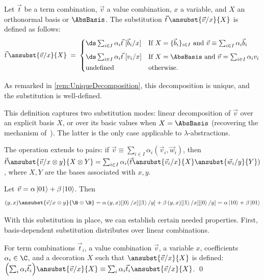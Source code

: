 \begin{definition}\label{def:basisDependentSub}
  Let $\vec t$ be a term combination, $\vec v$ a value combination, $x$ a
  variable, and $X$ an orthonormal basis or $\AbsBasis$. The substitution 
  $\vec t\,\ansubst{\vec v/x}{X}$ is defined as follows:
  \[
  \vec t\,\ansubst{\vec v/x}{X}\;=\;
  \begin{cases}
    \ds\sum_{i\in I}\alpha_i\vec{t}\;[\vec{b}_i/x] &
    \text{If } X=\{\vec{b}_i\}_{i\in I}\text{ and }
    \vec{v}\equiv\sum_{i\in I} \alpha_i\vec{b}_i\\[6pt]
    \ds\sum_{i\in I}\alpha_i\vec{t}\;[v_i/x] &
    \text{If }X=\AbsBasis\text{ and }
    \vec{v}=\sum_{i\in I} \alpha_i v_i\\[2pt]
    \text{undefined} & \text{otherwise.}
  \end{cases}
  \]
  
  As remarked in \ref{rem:UniqueDecomposition}, this decomposition
  is unique, and the substitution is well-defined.
\end{definition}

This definition captures two substitution modes: linear decomposition of $\vec v$
over an explicit basis $X$, or over its basic values when $X=\AbsBasis$
(recovering the mechanism of~\cite{ArrighiDowekLMCS17}). The latter is the only
case applicable to $\lambda$-abstractions.

The operation extends to pairs: if
$\vec v\equiv\sum_{i\in I}\alpha_i(\vec{v}_i, \vec{w}_i)$, then $\vec t
\ansubst{\vec v/x\otimes y}{X\otimes Y} = \sum_{i\in I}\alpha_i (\vec t
\ansubst{\vec{v}_i/x}{X}\ansubst{\vec{w}_i/y}{Y})$, where $X, Y$ are
the bases associated with $x, y$.

\begin{example}
  Let
  $\vec v = \alpha\left\vert{01}\right\rangle
           + \beta\left\vert{10}\right\rangle$.
  Then 
  \[
    (y,x)\ansubst{\vec v/x\otimes y}{\B\otimes\B}
    = \alpha\,(y,x)[\ket{0}/x][\ket{1}/y]
    + \beta\,(y,x)[\ket{1}/x][\ket{0}/y] 
    = 
    \alpha\ket{10}
    + \beta\ket{01}
  \]
\end{example}

With this substitution in place, we can establish certain needed properties.
First, basis-dependent substitution distributes over linear combinations.

\begin{lemma}\label{lem:distributiveSubstitution}
  For term combinations $\vec{t}_{i}$, a value combination $\vec{v}$, a
  variable $x$, coefficients $\alpha_i\in\C$, and a decoration $X$ such that
  $\ansubst{\vec v/x}{X}$ is defined:
  \(
    \Bigl(\sum_i \alpha_i\vec{t}_{i}\Bigr)\ansubst{\vec v/x}{X}
    \equiv
    \sum_i \alpha_i\vec{t}_{i} \ansubst{\vec v/x}{X}
  \).
  \qed
\end{lemma}

